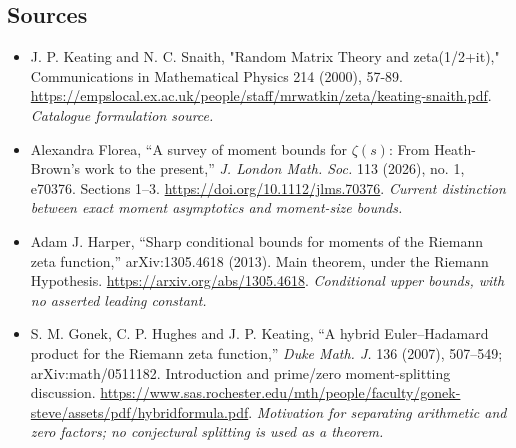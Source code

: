 \documentclass[11pt,a4paper]{article}
\numberwithin{equation}{section}
\begin{document}
\subsection{Sources}
\begin{itemize}\raggedright
\item[\textnormal{[S1]}]\hypertarget{source:162:1}{} J. P. Keating and N. C. Snaith, "Random Matrix Theory and zeta(1/2+it)," Communications in Mathematical Physics 214 (2000), 57-89.
\url{https://empslocal.ex.ac.uk/people/staff/mrwatkin/zeta/keating-snaith.pdf}.
{\small\textit{Catalogue formulation source.}}
\item[\textnormal{[E1]}]\hypertarget{extra:162:1}{} Alexandra Florea, ``A survey of moment bounds for $\zeta(s)$: From Heath-Brown's work to the present,'' \emph{J. London Math. Soc.} 113 (2026), no. 1, e70376. Sections 1--3.
\url{https://doi.org/10.1112/jlms.70376}.
{\small\textit{Current distinction between exact moment asymptotics and moment-size bounds.}}
\item[\textnormal{[E2]}]\hypertarget{extra:162:2}{} Adam J. Harper, ``Sharp conditional bounds for moments of the Riemann zeta function,'' arXiv:1305.4618 (2013). Main theorem, under the Riemann Hypothesis.
\url{https://arxiv.org/abs/1305.4618}.
{\small\textit{Conditional upper bounds, with no asserted leading constant.}}
\item[\textnormal{[E3]}]\hypertarget{extra:162:3}{} S. M. Gonek, C. P. Hughes and J. P. Keating, ``A hybrid Euler--Hadamard product for the Riemann zeta function,'' \emph{Duke Math. J.} 136 (2007), 507--549; arXiv:math/0511182. Introduction and prime/zero moment-splitting discussion.
\url{https://www.sas.rochester.edu/mth/people/faculty/gonek-steve/assets/pdf/hybridformula.pdf}.
{\small\textit{Motivation for separating arithmetic and zero factors; no conjectural splitting is used as a theorem.}}
\end{itemize}
\end{document}

